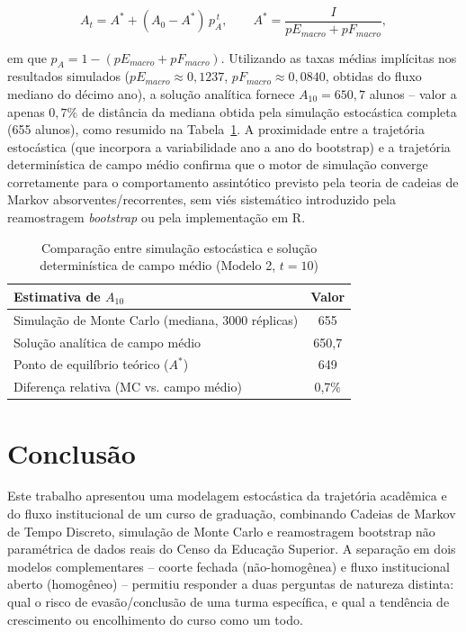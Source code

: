 \documentclass[12pt,times,article,chapter=TITLE]{abnt}
\begin{document}
\begin{equation}
A_t = A^\ast + (A_0 - A^\ast)\, p_A^{\,t}, \qquad A^\ast = \frac{I}{pE_{macro}+pF_{macro}},
\end{equation}

em que $p_A = 1-(pE_{macro}+pF_{macro})$. Utilizando as taxas médias implícitas nos resultados simulados ($pE_{macro}\approx 0{,}1237$, $pF_{macro}\approx 0{,}0840$, obtidas do fluxo mediano do décimo ano), a solução analítica fornece $A_{10} = 650{,}7$ alunos -- valor a apenas $0{,}7\%$ de distância da mediana obtida pela simulação estocástica completa (655 alunos), como resumido na Tabela~\ref{tab:validacao2}. A proximidade entre a trajetória estocástica (que incorpora a variabilidade ano a ano do bootstrap) e a trajetória determinística de campo médio confirma que o motor de simulação converge corretamente para o comportamento assintótico previsto pela teoria de cadeias de Markov absorventes/recorrentes, sem viés sistemático introduzido pela reamostragem \textit{bootstrap} ou pela implementação em R.

\begin{table}[H]
\centering
\caption{Comparação entre simulação estocástica e solução determinística de campo médio (Modelo 2, $t=10$)}
\label{tab:validacao2}
\begin{tabular}{lc}
\toprule
Estimativa de $A_{10}$ & Valor \\
\midrule
Simulação de Monte Carlo (mediana, 3000 réplicas) & 655 \\
Solução analítica de campo médio & 650,7 \\
Ponto de equilíbrio teórico ($A^\ast$) & 649 \\
Diferença relativa (MC vs. campo médio) & 0,7\% \\
\bottomrule
\end{tabular}
\end{table}


\chapter{Conclusão}
\label{sec:conclusao}

Este trabalho apresentou uma modelagem estocástica da trajetória acadêmica e do fluxo institucional de um curso de graduação, combinando Cadeias de Markov de Tempo Discreto, simulação de Monte Carlo e reamostragem bootstrap não paramétrica de dados reais do Censo da Educação Superior. A separação em dois modelos complementares -- coorte fechada (não-homogênea) e fluxo institucional aberto (homogêneo) -- permitiu responder a duas perguntas de natureza distinta: qual o risco de evasão/conclusão de uma turma específica, e qual a tendência de crescimento ou encolhimento do curso como um todo.
\end{document}
